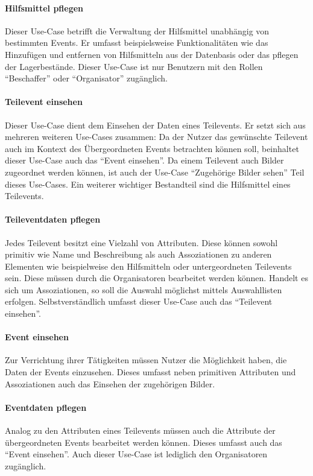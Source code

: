 \paragraph{Hilfsmittel pflegen}
Dieser Use-Case betrifft die Verwaltung der Hilfsmittel unabhängig von bestimmten Events. Er umfasst beispielsweise Funktionalitäten wie das Hinzufügen und entfernen von Hilfsmitteln aus der Datenbasis oder das pflegen der Lagerbestände. Dieser Use-Case ist nur Benutzern mit den Rollen \enquote{Beschaffer} oder \enquote{Organisator} zugänglich.

\paragraph{Teilevent einsehen}
Dieser Use-Case dient dem Einsehen der Daten eines Teilevents. Er setzt sich aus mehreren weiteren Use-Cases zusammen: Da der Nutzer das gewünschte Teilevent auch im Kontext des Übergeordneten Events betrachten können soll, beinhaltet dieser Use-Case auch das \enquote{Event einsehen}. Da einem Teilevent auch Bilder zugeordnet werden können, ist auch der Use-Case \enquote{Zugehörige Bilder sehen} Teil dieses Use-Cases. Ein weiterer wichtiger Bestandteil sind die Hilfsmittel eines Teilevents.

\paragraph{Teileventdaten pflegen}
Jedes Teilevent besitzt eine Vielzahl von Attributen. Diese können sowohl primitiv wie Name und Beschreibung als auch Assoziationen zu anderen Elementen wie beispielweise den Hilfsmitteln oder untergeordneten Teilevents sein. Diese müssen durch die Organisatoren bearbeitet werden können. Handelt es sich um Assoziationen, so soll die Auswahl möglichst mittels Auswahllisten erfolgen. Selbstverständlich umfasst dieser Use-Case auch das \enquote{Teilevent einsehen}.

\paragraph{Event einsehen}
Zur Verrichtung ihrer Tätigkeiten müssen Nutzer die Möglichkeit haben, die Daten der Events einzusehen. Dieses umfasst neben primitiven Attributen und Assoziationen auch das Einsehen der zugehörigen Bilder.

\paragraph{Eventdaten pflegen}
Analog zu den Attributen eines Teilevents müssen auch die Attribute der übergeordneten Events bearbeitet werden können. Dieses umfasst auch das \enquote{Event einsehen}. Auch dieser Use-Case ist lediglich den Organisatoren zugänglich.

